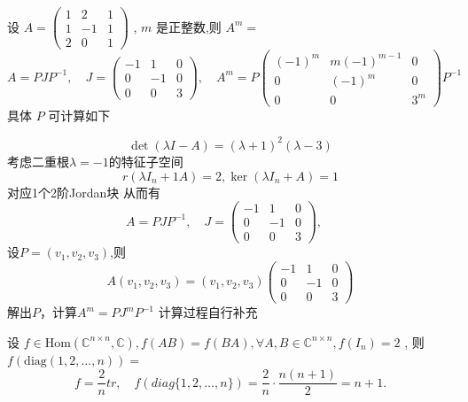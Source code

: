 \documentclass[lang=cn,12pt]{elegantbook}
\begin{document}
\begin{example}
    设 \(A = \left( \begin{array}{ccc}1 & 2 & 1 \\ 1 & -1 & 1 \\ 2 & 0 & 1 \end{array} \right)\) , \(m\) 是正整数,则 \(A^{m} =\)
    \[
    A = PJP^{-1},\quad J = \begin{pmatrix}-1 & 1 & 0 \\ 0 & -1 & 0 \\ 0 & 0 & 3\end{pmatrix},\quad
    A^m = P\begin{pmatrix}(-1)^m & m(-1)^{m-1} & 0 \\ 0 & (-1)^m & 0 \\ 0 & 0 & 3^m\end{pmatrix}P^{-1}
    \]
    具体 \(P\) 可计算如下
\end{example}

\begin{solution}
    \[
    \det(\lambda I - A) = (\lambda +1) ^2(\lambda -3) 
    \]
    考虑二重根$\lambda = -1$的特征子空间
    \[
    r(\lambda I_n +1 A) = 2, \ker(\lambda I_n + A) = 1 
    \]
    对应1个2阶Jordan块 从而有
    \[
    A = PJP^{-1},\quad J = \begin{pmatrix}-1 & 1 & 0 \\ 0 & -1 & 0 \\ 0 & 0 & 3\end{pmatrix},\quad
    \]
    设$P = (v_1,v_2,v_3)$,则
    \[
    A(v_1,v_2,v_3) = (v_1,v_2,v_3)\begin{pmatrix}-1 & 1 & 0 \\ 0 & -1 & 0 \\ 0 & 0 & 3\end{pmatrix}
    \]
    解出$P$，计算$A^m = PJ^mP^{-1}$ 计算过程自行补充
\end{solution}

\begin{example}
    设 \(f \in \mathrm{Hom}(\mathbb{C}^{n \times n}, \mathbb{C}), f(AB) = f(BA), \forall A, B \in \mathbb{C}^{n \times n}, f(I_n) = 2\) , 则 \(f(\mathrm{diag}(1, 2, \ldots , n)) =\)
    \[
    f = \frac{2}{n}tr,\quad f(diag\{1,2,\dots,n\}) = \frac{2}{n}\cdot\frac{n(n+1)}{2}=n+1.
    \]
\end{example}
\end{document}
